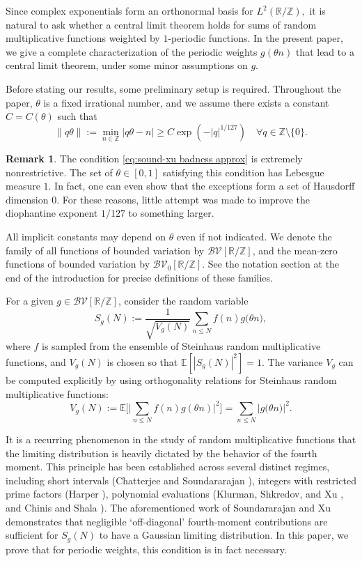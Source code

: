\documentclass[12pt]{amsart}
\renewcommand{\leq}{\leqslant}
\renewcommand{\geq}{\geqslant}
\numberwithin{equation}{section}
\theoremstyle{plain}
\theoremstyle{definition}
\newtheorem{rem}[thm]{Remark}
\newcommand{\Z}{\mathbb{Z}}
\newcommand{\R}{\mathbb{R}}
\newcommand{\E}{\mathbb{E}}
\newcommand{\CB}{\mathcal{B}}
\newcommand{\CV}{\mathcal{V}}
\begin{document}
	Since complex exponentials form an orthonormal basis for $L^2(\R/\Z),$ it is natural to ask whether a central limit theorem holds for sums of random multiplicative functions weighted by $1$-periodic functions. In the present paper, we give a complete characterization of the periodic weights $g(\theta n)$ that lead to a central limit theorem, under some minor assumptions on $g$. 
	
	Before stating our results, some preliminary setup is required. Throughout the paper, $\theta$ is a fixed irrational number, and we assume there exists a constant $C = C(\theta)$ such that
	\begin{equation}\label{eq:sound-xu badness approx}
		\|q\theta\|:= \min_{n \in \Z}|q \theta -n |\geq C\exp(-|q|^{1/127}) \quad \forall q \in \Z \setminus \{0\}.
	\end{equation}
	\begin{rem}
		The condition \eqref{eq:sound-xu badness approx} is extremely nonrestrictive. The set of $\theta \in [0,1]$ satisfying this condition has Lebesgue measure $1$. In fact, one can even show that the exceptions form a set of Hausdorff dimension $0$. For these reasons, little attempt was made to improve the diophantine exponent $1/127$ to something larger. 
	\end{rem}
	
	All implicit constants may depend on $\theta$ even if not indicated. We denote the family of all functions of bounded variation by $\CB\CV[\R/\Z]$, and the mean-zero functions of bounded variation by $\CB\CV_0[\R/\Z]$. See the notation section at the end of the introduction for precise definitions of these families.
	
	For a given $g \in \CB\CV[\R/\Z]$, consider the random variable
	\begin{equation}\label{eq:def S_N}
		S_{g}(N) := \frac{1}{\sqrt{V_{g}(N)}}\sum_{n \leq N} f(n) g\big(\theta n\big),
	\end{equation}
	where $f$ is sampled from the ensemble of Steinhaus random multiplicative functions, and $V_{g}(N)$ is chosen so that $\E[|S_g(N)|^2] = 1$. The variance $V_g$ can be computed explicitly by using orthogonality relations for Steinhaus random multiplicative functions:
	$$V_{g}(N) := \E\Big[\Big|\sum_{n \leq N} f(n)g(\theta n)\Big|^2\Big] = \sum_{n \leq N}\Big|g\big(\theta n\big)\Big|^2.$$
	
	It is a recurring phenomenon in the study of random multiplicative functions that the limiting distribution is heavily dictated by the behavior of the fourth moment. This principle has been established across several distinct regimes, including short intervals (Chatterjee and Soundararajan \cite{chatterjee2012random}), integers with restricted prime factors (Harper \cite{harper2013limit}), polynomial evaluations (Klurman, Shkredov, and Xu \cite{klurman2023random}, and Chinis and Shala \cite{chinis2025random}). The aforementioned work of Soundararajan and Xu demonstrates that negligible `off-diagonal' fourth-moment contributions are sufficient for $S_g(N)$ to have a Gaussian limiting distribution. In this paper, we prove that for periodic weights, this condition is in fact necessary. 
	
\end{document}
